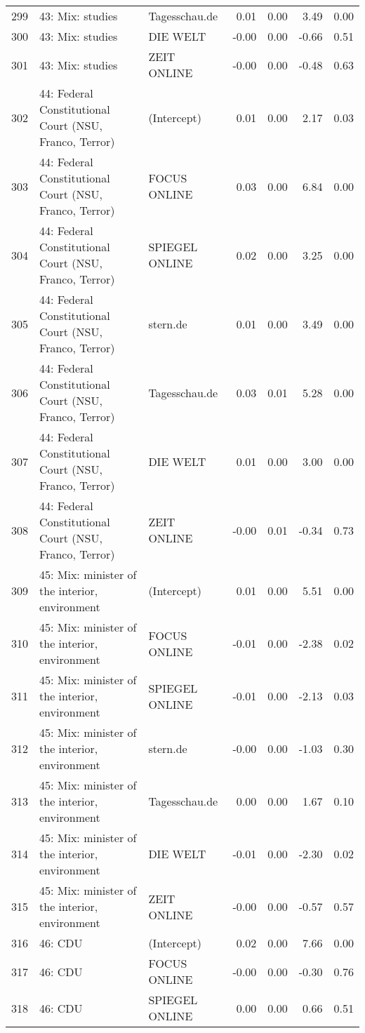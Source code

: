 \begin{table}[ht]
{\begin{tabular}{rllrrrr}
  299 & 43: Mix: studies & Tagesschau.de & 0.01 & 0.00 & 3.49 & 0.00 \\ 
  300 & 43: Mix: studies & DIE WELT & -0.00 & 0.00 & -0.66 & 0.51 \\ 
  301 & 43: Mix: studies & ZEIT ONLINE & -0.00 & 0.00 & -0.48 & 0.63 \\ 
  302 & 44: Federal Constitutional Court (NSU, Franco, Terror) & (Intercept) & 0.01 & 0.00 & 2.17 & 0.03 \\ 
  303 & 44: Federal Constitutional Court (NSU, Franco, Terror) & FOCUS ONLINE & 0.03 & 0.00 & 6.84 & 0.00 \\ 
  304 & 44: Federal Constitutional Court (NSU, Franco, Terror) & SPIEGEL ONLINE & 0.02 & 0.00 & 3.25 & 0.00 \\ 
  305 & 44: Federal Constitutional Court (NSU, Franco, Terror) & stern.de & 0.01 & 0.00 & 3.49 & 0.00 \\ 
  306 & 44: Federal Constitutional Court (NSU, Franco, Terror) & Tagesschau.de & 0.03 & 0.01 & 5.28 & 0.00 \\ 
  307 & 44: Federal Constitutional Court (NSU, Franco, Terror) & DIE WELT & 0.01 & 0.00 & 3.00 & 0.00 \\ 
  308 & 44: Federal Constitutional Court (NSU, Franco, Terror) & ZEIT ONLINE & -0.00 & 0.01 & -0.34 & 0.73 \\ 
  309 & 45: Mix: minister of the interior, environment & (Intercept) & 0.01 & 0.00 & 5.51 & 0.00 \\ 
  310 & 45: Mix: minister of the interior, environment & FOCUS ONLINE & -0.01 & 0.00 & -2.38 & 0.02 \\ 
  311 & 45: Mix: minister of the interior, environment & SPIEGEL ONLINE & -0.01 & 0.00 & -2.13 & 0.03 \\ 
  312 & 45: Mix: minister of the interior, environment & stern.de & -0.00 & 0.00 & -1.03 & 0.30 \\ 
  313 & 45: Mix: minister of the interior, environment & Tagesschau.de & 0.00 & 0.00 & 1.67 & 0.10 \\ 
  314 & 45: Mix: minister of the interior, environment & DIE WELT & -0.01 & 0.00 & -2.30 & 0.02 \\ 
  315 & 45: Mix: minister of the interior, environment & ZEIT ONLINE & -0.00 & 0.00 & -0.57 & 0.57 \\ 
  316 & 46: CDU & (Intercept) & 0.02 & 0.00 & 7.66 & 0.00 \\ 
  317 & 46: CDU & FOCUS ONLINE & -0.00 & 0.00 & -0.30 & 0.76 \\ 
  318 & 46: CDU & SPIEGEL ONLINE & 0.00 & 0.00 & 0.66 & 0.51 \\ 

\end{tabular}}
\end{table}
